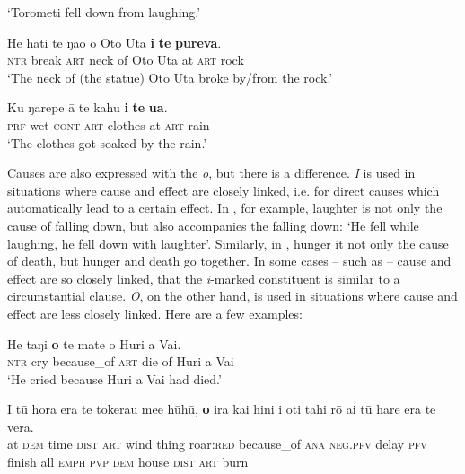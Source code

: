 \glt 
‘Torometi fell down from laughing.’ \textstyleExampleref{[R245.105]} 
\z

\ea\label{ex:4.250}
\gll He hati te ŋao o {\ꞌ}Oto {\ꞌ}Uta \textbf{{\ꞌ}i} \textbf{te} \textbf{pureva}. \\
\textsc{ntr} break \textsc{art} neck of Oto Uta at \textsc{art} rock \\

\glt 
‘The neck of (the statue) Oto Uta broke by/from the rock.’ \textstyleExampleref{[MsE-089.002]}
\z

\ea\label{ex:4.251}
\gll Ku ŋarepe {\ꞌ}ā te kahu \textbf{{\ꞌ}i} \textbf{te} \textbf{{\ꞌ}ua}. \\
\textsc{prf} wet \textsc{cont} \textsc{art} clothes at \textsc{art} rain \\

\glt 
‘The clothes got soaked by the rain.’ 
\z

Causes are also expressed with the  \textit{{\ꞌ}o}, but there is a difference. \textit{{\ꞌ}I} is used in situations where cause and effect are closely linked, i.e. for direct causes which automatically lead to a certain effect. In , for example, laughter is not only the cause of falling down, but also accompanies the falling down: ‘He fell while laughing, he fell down with laughter’. Similarly, in , hunger it not only the cause of death, but hunger and death go together. In some cases – such as  – cause and effect are so closely linked, that the \textit{{\ꞌ}i}\nobreakdash-marked constituent is similar to a circumstantial clause. \textit{{\ꞌ}O}, on the other hand, is used in situations where cause and effect are less closely linked. Here are a few examples:

\ea\label{ex:4.252}
\gll He taŋi \textbf{{\ꞌ}o} te mate o Huri {\ꞌ}a Vai. \\
\textsc{ntr} cry because\_of \textsc{art} die of Huri a Vai \\

\glt 
‘He cried because Huri a Vai had died.’ \textstyleExampleref{[R304.104]} 
\z

\ea\label{ex:4.253}
\gll {\ꞌ}I tū hora era te tokerau me{\ꞌ}e hūhū, \textbf{{\ꞌ}o} ira kai hini i oti tahi rō ai tū hare era te vera. \\
at \textsc{dem} time \textsc{dist} \textsc{art} wind thing roar:\textsc{red} because\_of \textsc{ana} \textsc{neg.pfv} delay \textsc{pfv} finish all \textsc{emph} \textsc{pvp} \textsc{dem} house \textsc{dist} \textsc{art} burn \\

